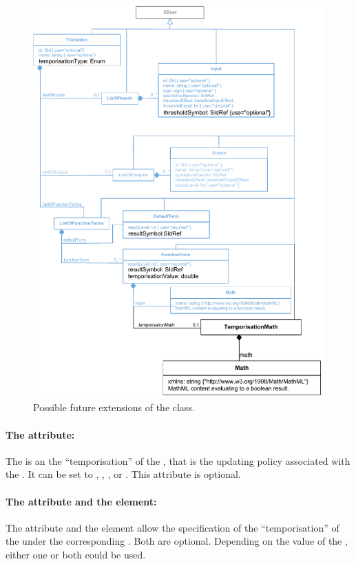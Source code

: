 \begin{figure}[hb]
  \includegraphics{figs/qual-transition-future-uml.pdf}
  \caption{Possible future extensions of the \Transition class.}
  \label{qual_future_directions}
\end{figure}

\paragraph{The  attribute:} %
The  is an  the ``temporisation'' of the , that is the updating policy associated with the . It can be set to , , ,  or .
This attribute is optional. 



\paragraph{The  attribute and the  element:}
The attribute  and the element  allow the specification of the ``temporisation'' of the  under the corresponding . Both are optional. Depending on the value of the , either one or both could be used.

